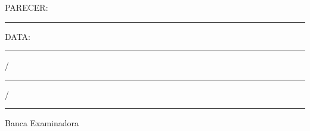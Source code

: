 \begin{titlepage}

\setlength{\ABNTsignthickness}{0.3pt}
\setlength{\ABNTsignwidth}{10cm}
\setlength{\ABNTsignskip}{0.7cm}

\begin{center}
	{\tituloformat\ABNTtitulodata\par}
\end{center}

\vspace{0.3cm}

\begin{center}
	\autorformat\ABNTautordata
\end{center}

\vspace{0.3cm}

\begin{flushleft}
PARECER: \rule{7cm}{.3pt}

DATA: \rule{0.75cm}{.3pt}/\rule{0.75cm}{.3pt}/\rule{1.5cm}{.3pt}
\end{flushleft}

\begin{center}
Banca Examinadora
\end{center}


\vspace{3cm}


\vspace{3cm}


\end{titlepage}
